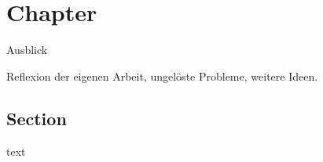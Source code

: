 \chapter{Chapter}
\label{ch:Chapter}
Ausblick

Reflexion der eigenen Arbeit, ungelöste Probleme, weitere Ideen.

\section{Section}
\label{sec:Section}
text \par
\vspace{\baselineskip}
\noindent
